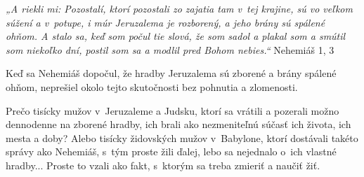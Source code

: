








{\it „A riekli mi: Pozostalí, ktorí pozostali zo zajatia tam v~tej krajine, sú vo veľkom súžení a v~potupe, i múr Jeruzalema je rozborený, a jeho brány sú spálené ohňom. A stalo sa, keď som počul tie slová, že som sadol a plakal som a smútil som niekoľko dní, postil som sa a modlil pred Bohom nebies.“} Nehemiáš 1, 3 

Keď sa Nehemiáš dopočul, že hradby Jeruzalema sú zborené a brány spálené ohňom, neprešiel okolo tejto skutočnosti bez pohnutia a zlomenosti. 

Prečo tisícky mužov v~Jeruzaleme a Judsku, ktorí sa vrátili a pozerali možno dennodenne na zborené hradby, ich brali ako nezmeniteľnú súčasť ich života, ich mesta a doby? Alebo tisícky židovských mužov v~Babylone, ktorí dostávali takéto správy ako Nehemiáš, s~tým proste žili ďalej, lebo sa nejednalo o~ich vlastné hradby... Proste to vzali ako fakt, s~ktorým sa treba zmieriť a naučiť žiť. 

